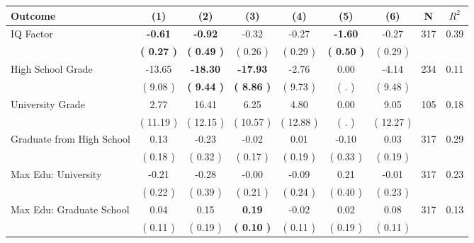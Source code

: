 \begin{tabular}{lcccccccc}
\toprule
 \textbf{Outcome} & \textbf{(1)} & \textbf{(2)} & \textbf{(3)} & \textbf{(4)} & \textbf{(5)} & \textbf{(6)} & \textbf{N} & \textbf{$ R^2$} \\
\midrule
IQ Factor & \textbf{    -0.61} & \textbf{    -0.92} &     -0.32 &     -0.27 & \textbf{    -1.60} &     -0.27 & 317 &       0.39 \\ 
 & \textbf{(     0.27 )} & \textbf{(     0.49 )} & (     0.26 ) & (     0.29 ) & \textbf{(     0.50 )} & (     0.29 ) & \\
High School Grade &    -13.65 & \textbf{   -18.30} & \textbf{   -17.93} &     -2.76 &      0.00 &     -4.14 & 234 &       0.11 \\ 
 & (     9.08 ) & \textbf{(     9.44 )} & \textbf{(     8.86 )} & (     9.73 ) & (        . ) & (     9.48 ) & \\
University Grade &      2.77 &     16.41 &      6.25 &      4.80 &      0.00 &      9.05 & 105 &       0.18 \\ 
 & (    11.19 ) & (    12.15 ) & (    10.57 ) & (    12.88 ) & (        . ) & (    12.27 ) & \\
Graduate from High School &      0.13 &     -0.23 &     -0.02 &      0.01 &     -0.10 &      0.03 & 317 &       0.29 \\ 
 & (     0.18 ) & (     0.32 ) & (     0.17 ) & (     0.19 ) & (     0.33 ) & (     0.19 ) & \\
Max Edu: University &     -0.21 &     -0.28 &     -0.00 &     -0.09 &      0.21 &     -0.01 & 317 &       0.23 \\ 
 & (     0.22 ) & (     0.39 ) & (     0.21 ) & (     0.24 ) & (     0.40 ) & (     0.23 ) & \\
Max Edu: Graduate School &      0.04 &      0.15 & \textbf{     0.19} &     -0.02 &      0.02 &      0.08 & 317 &       0.13 \\ 
 & (     0.11 ) & (     0.19 ) & \textbf{(     0.10 )} & (     0.11 ) & (     0.19 ) & (     0.11 ) & \\
\bottomrule
\end{tabular}
